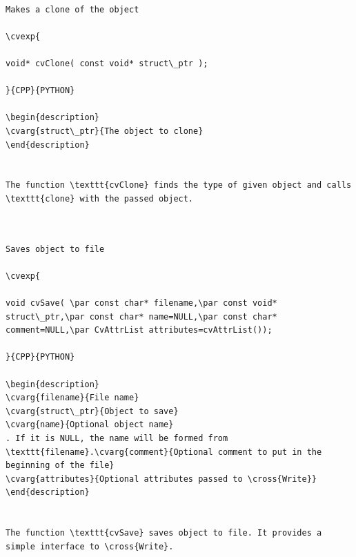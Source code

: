 \label{Clone}
\begin{verbatim}

Makes a clone of the object

\cvexp{

void* cvClone( const void* struct\_ptr );

}{CPP}{PYTHON}

\begin{description}
\cvarg{struct\_ptr}{The object to clone}
\end{description}


The function \texttt{cvClone} finds the type of given object and calls \texttt{clone} with the passed object.


\end{verbatim}
\label{Save}
\begin{verbatim}

Saves object to file

\cvexp{

void cvSave( \par const char* filename,\par const void* struct\_ptr,\par const char* name=NULL,\par const char* comment=NULL,\par CvAttrList attributes=cvAttrList());

}{CPP}{PYTHON}

\begin{description}
\cvarg{filename}{File name}
\cvarg{struct\_ptr}{Object to save}
\cvarg{name}{Optional object name}
. If it is NULL, the name will be formed from \texttt{filename}.\cvarg{comment}{Optional comment to put in the beginning of the file}
\cvarg{attributes}{Optional attributes passed to \cross{Write}}
\end{description}


The function \texttt{cvSave} saves object to file. It provides a simple interface to \cross{Write}.


\end{verbatim}
\label{Load}
